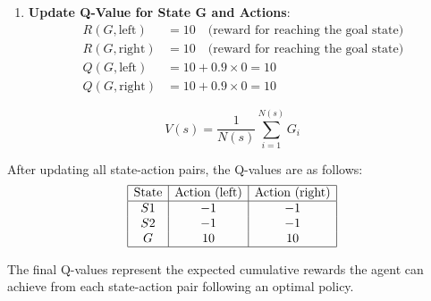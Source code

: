 \documentclass{article}
\begin{document}
\begin{enumerate}
    \item \textbf{Update Q-Value for State G and Actions}:
   \begin{align*}
   R(G, \text{left}) &= 10 \quad \text{(reward for reaching the goal state)} \\
   R(G, \text{right}) &= 10 \quad \text{(reward for reaching the goal state)} \\
   Q(G, \text{left}) &= 10 + 0.9 \times 0 = 10 \\
   Q(G, \text{right}) &= 10 + 0.9 \times 0 = 10
   \end{align*}
\end{enumerate}

\[V(s) = \frac{1}{N(s)} \sum_{i=1}^{N(s)} G_i \]

After updating all state-action pairs, the Q-values are as follows:
   \[
   \begin{array}{|c|c|c|}
   \hline
   \text{State} & \text{Action (left)} & \text{Action (right)} \\
   \hline
   S1 & -1 & -1 \\
   S2 & -1 & -1 \\
   G & 10 & 10 \\
   \hline
   \end{array}
   \]

The final Q-values represent the expected cumulative rewards the agent can achieve from each state-action pair following an optimal policy.
\end{document}
